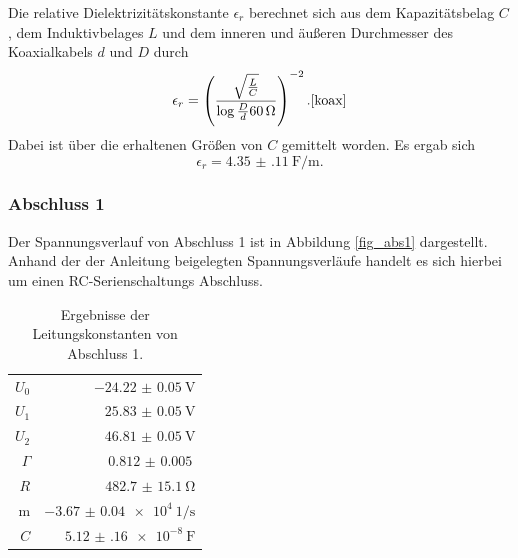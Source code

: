 Die relative Dielektrizitätskonstante $\epsilon_r$ berechnet sich aus dem Kapazitätsbelag $C$, dem Induktivbelages $L$ und dem inneren und äußeren Durchmesser des Koaxialkabels $d$ und $D$ durch
\begin{equation*}
	\epsilon_r = \left(\frac{\sqrt{\frac{L}{C}}}{\log{\frac{D}{d}} \SI{60}{\ohm}}\right)^{-2}. \text{\cite{koax}}
\end{equation*}
Dabei ist über die erhaltenen Größen von $C$ gemittelt worden.
Es ergab sich
\begin{equation*}
	\epsilon_r = \SI{4.35(11)}{\farad\per\meter}.
\end{equation*}

\subsubsection{Abschluss 1} %
\label{sub:abschluss_1}

Der Spannungsverlauf von Abschluss 1 ist in Abbildung \ref{fig_abs1} dargestellt.
Anhand der der Anleitung beigelegten Spannungsverläufe handelt es sich hierbei um einen RC-Serien\-schaltungs Abschluss.


\begin{table}
\centering
	\caption[]{Ergebnisse der Leitungskonstanten von Abschluss 1.}
	\begin{tabular}{r|r}
	\toprule
		$U_0$    & $\SI{-24.22(5)}{\volt}$\\
		$U_1$    & $\SI{25.83(5)}{\volt}$\\
		$U_2$    & $\SI{46.81(5)}{\volt}$\\
		$\Gamma$ & $\SI{0.812(5)}{}$\\
		$R$    	 & $\SI{482.7(151)}{\ohm}$\\
		m        & $\SI{-3.67(4)e4}{1\per\second}$\\
		$C$      & $\SI{5.12(16)e-8}{\farad}$\\
		\bottomrule
	\end{tabular}
\end{table}

